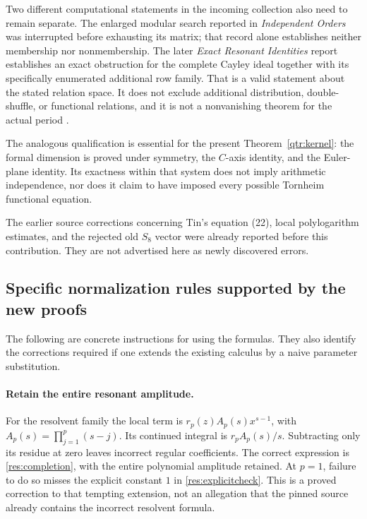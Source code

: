 Two different computational statements in the incoming collection
also need to remain separate. The enlarged modular search reported
in \emph{Independent Orders} was interrupted before exhausting its
matrix; that record alone establishes neither membership nor
nonmembership. The later \emph{Exact Resonant Identities} report
establishes an exact obstruction for the complete Cayley ideal
together with its specifically enumerated additional row family.
That is a valid statement about the stated relation space. It does
not exclude additional distribution, double-shuffle, or functional
relations, and it is not a nonvanishing theorem for the actual
period \cite{qtr:Independent,ghp:ExactResonant}.

The analogous qualification is essential for the present
Theorem~\ref{qtr:kernel}: the formal dimension is proved under
symmetry, the $C$-axis identity, and the Euler-plane identity.
Its exactness within that system does not imply arithmetic
independence, nor does it claim to have imposed every possible
Tornheim functional equation.

The earlier source corrections concerning Tin's equation (22),
local polylogarithm estimates, and the rejected old $S_8$ vector
were already reported before this contribution. They are not
advertised here as newly discovered errors.

\subsection{Specific normalization rules supported by the new proofs}

The following are concrete instructions for using the formulas.
They also identify the corrections required if one extends the
existing calculus by a naive parameter substitution.

\paragraph{Retain the entire resonant amplitude.}
For the resolvent family the local term is
$r_p(z)A_p(s)x^{s-1}$, with
$A_p(s)=\prod_{j=1}^p(s-j)$. Its continued integral is
$r_pA_p(s)/s$. Subtracting only its residue at zero leaves
incorrect regular coefficients. The correct expression is
\eqref{res:completion}, with the entire polynomial amplitude
retained. At $p=1$, failure to do so misses the explicit constant
$1$ in \eqref{res:explicitcheck}. This is a proved correction
to that tempting extension, not an allegation that the pinned
source already contains the incorrect resolvent formula.

